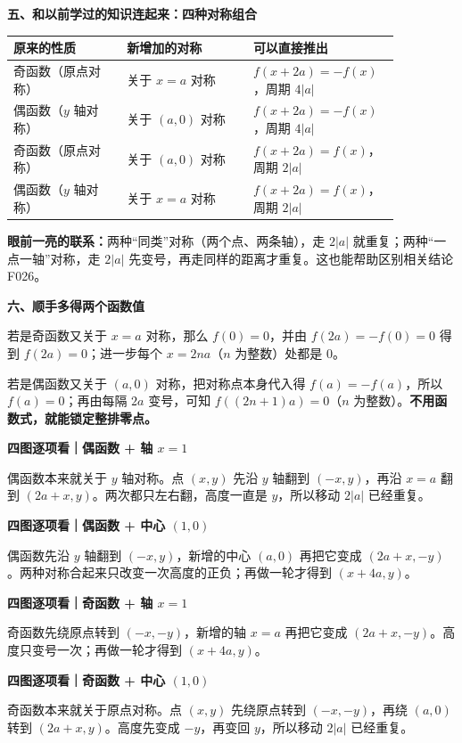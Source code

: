 \begin{explanationbox}
\textbf{\textcolor{CExplanation}{五、和以前学过的知识连起来：四种对称组合}}



\begin{center}
\begin{tabular}{p{0.27\linewidth}|p{0.30\linewidth}|p{0.29\linewidth}}
原来的性质 & 新增加的对称 & 可以直接推出\\ \hline
奇函数（原点对称） & 关于 $x=a$ 对称 & $f(x+2a)=-f(x)$，周期 $4|a|$\\
偶函数（$y$ 轴对称） & 关于 $(a,0)$ 对称 & $f(x+2a)=-f(x)$，周期 $4|a|$\\
奇函数（原点对称） & 关于 $(a,0)$ 对称 & $f(x+2a)=f(x)$，周期 $2|a|$\\
偶函数（$y$ 轴对称） & 关于 $x=a$ 对称 & $f(x+2a)=f(x)$，周期 $2|a|$
\end{tabular}
\end{center}
\textbf{眼前一亮的联系：}两种“同类”对称（两个点、两条轴），走 $2|a|$ 就重复；两种“一点一轴”对称，走 $2|a|$ 先变号，再走同样的距离才重复。这也能帮助区别相关结论 F026。

\medskip

\end{explanationbox}
\clearpage
\begin{explanationbox}
\textbf{\textcolor{CExplanation}{六、顺手多得两个函数值}}



若是奇函数又关于 $x=a$ 对称，那么 $f(0)=0$，并由 $f(2a)=-f(0)=0$ 得到 $f(2a)=0$；进一步每个 $x=2na$（$n$ 为整数）处都是 $0$。

若是偶函数又关于 $(a,0)$ 对称，把对称点本身代入得 $f(a)=-f(a)$，所以 $f(a)=0$；再由每隔 $2a$ 变号，可知 $f((2n+1)a)=0$（$n$ 为整数）。\textbf{不用函数式，就能锁定整排零点。}
\end{explanationbox}
\clearpage
\begin{explanationbox}
\textbf{四图逐项看｜偶函数 + 轴 $x=1$}

偶函数本来就关于 $y$ 轴对称。点 $(x,y)$ 先沿 $y$ 轴翻到 $(-x,y)$，再沿 $x=a$ 翻到 $(2a+x,y)$。两次都只左右翻，高度一直是 $y$，所以移动 $2|a|$ 已经重复。
\end{explanationbox}
\clearpage
\begin{explanationbox}
\textbf{四图逐项看｜偶函数 + 中心 $(1,0)$}

偶函数先沿 $y$ 轴翻到 $(-x,y)$，新增的中心 $(a,0)$ 再把它变成 $(2a+x,-y)$。两种对称合起来只改变一次高度的正负；再做一轮才得到 $(x+4a,y)$。
\end{explanationbox}
\clearpage
\begin{explanationbox}
\textbf{四图逐项看｜奇函数 + 轴 $x=1$}

奇函数先绕原点转到 $(-x,-y)$，新增的轴 $x=a$ 再把它变成 $(2a+x,-y)$。高度只变号一次；再做一轮才得到 $(x+4a,y)$。
\end{explanationbox}
\clearpage
\begin{explanationbox}
\textbf{四图逐项看｜奇函数 + 中心 $(1,0)$}

奇函数本来就关于原点对称。点 $(x,y)$ 先绕原点转到 $(-x,-y)$，再绕 $(a,0)$ 转到 $(2a+x,y)$。高度先变成 $-y$，再变回 $y$，所以移动 $2|a|$ 已经重复。
\end{explanationbox}
